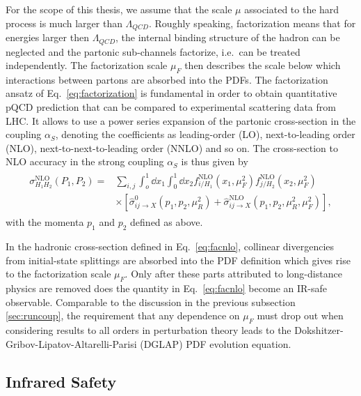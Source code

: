  For the scope of this thesis,
we assume that the scale $\mu$ associated to the hard process is much
larger than $\Lambda_{QCD}$. Roughly speaking,
factorization means that for energies larger then $\Lambda_{QCD}$,
the internal binding structure of
the hadron can be neglected and the partonic sub-channels factorize,
i.e.\ can be treated independently. The factorization scale $\mu_F$
then describes the scale below which interactions between partons are
absorbed into the PDFs. The factorization ansatz of Eq.~\eqref{eq:factorization} is
fundamental in order to obtain quantitative pQCD prediction that can be
compared to experimental scattering data from LHC. It allows to use a
power series expansion of the
partonic cross-section in the coupling $\alpha_S$, denoting the coefficients as leading-order
(LO), next-to-leading order (NLO), next-to-next-to-leading order
(NNLO) and so on. The cross-section to NLO accuracy in the strong coupling
$\alpha_S$ is thus given by
\begin{align}\label{eq:facnlo}
\begin{split}
  \sigma^{\text{NLO}}_{H_1 H_2}(P_1,P_2) =& \sum_{i,j}\int_o^1\dd x_1 \int_0^1 \dd
  x_2f^{\text{NLO}}_{i/H_1}(x_1,\mu_F^2)f^{\text{NLO}}_{j/H_2}(x_2,\mu_F^2)\\
&\times \left[ \hat \sigma^0_{ij\rightarrow
    X}(p_1,p_2,\mu_R^2)+\hat \sigma^{\text{NLO}}_{ij\rightarrow
    X}(p_1,p_2,\mu_R^2,\mu_F^2)\right],
\end{split}
\end{align}
with the momenta $p_1$ and $p_2$ defined as above. 

In the hadronic cross-section defined in
Eq.~\eqref{eq:facnlo}, collinear divergencies from initial-state
splittings are absorbed into the PDF definition which gives rise to
the factorization scale $\mu_F$. Only after these parts
attributed to long-distance physics are removed does the quantity in
Eq.~\eqref{eq:facnlo} become an IR-safe observable. Comparable to the
discussion in the previous subsection \ref{sec:runcoup}, the
requirement that any dependence on $\mu_F$ must drop out when
considering results to all orders in perturbation theory leads to the
Dokshitzer-Gribov-Lipatov-Altarelli-Parisi
\cite{Dokshitzer:1977sg,Gribov:1972ri,Altarelli:1977zs} (DGLAP) PDF
evolution equation.


\subsection{Infrared Safety}

